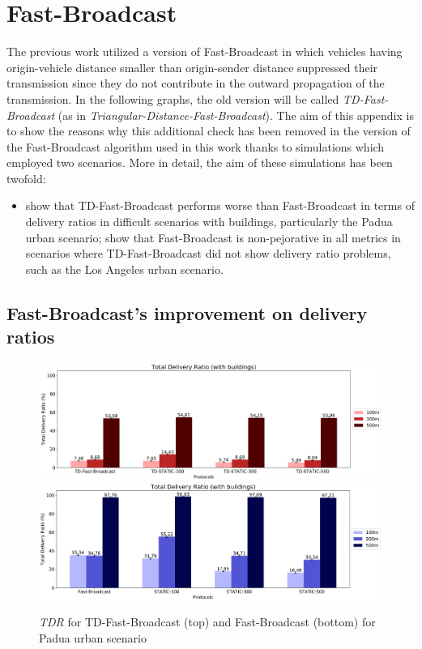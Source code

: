 
\chapter{Fast-Broadcast}
	The previous work \cite{ROM2017} utilized a version of Fast-Broadcast in which vehicles having origin-vehicle distance smaller than origin-sender distance suppressed their transmission since they do not contribute in the outward propagation of the transmission. In the following graphs, the old version will be called \textit{TD-Fast-Broadcast} (as in \textit{Triangular-Distance-Fast-Broadcast}). The aim of this appendix is to show the reasons why this additional check has been removed in the version of the Fast-Broadcast algorithm used in this work thanks to simulations which employed two scenarios. More in detail, the aim of these simulations has been twofold:
	\begin{itemize}
		\item show that TD-Fast-Broadcast performs worse than Fast-Broadcast in terms of delivery ratios in difficult scenarios with buildings, particularly the Padua urban scenario;
		\show show that Fast-Broadcast is non-pejorative in all metrics in scenarios where TD-Fast-Broadcast did not show delivery ratio problems, such as the Los Angeles urban scenario.
	\end{itemize}

	\section{Fast-Broadcast's improvement on delivery ratios}
		\begin{figure}[H]
			\centering
			\includegraphics[width=1.0\textwidth]{immagini/td-fb-pd/td-fb/tdr}
			\includegraphics[width=1.0\textwidth]{immagini/td-fb-pd/fb/tdr}
			\caption{\textit{TDR} for TD-Fast-Broadcast (top) and Fast-Broadcast (bottom) for Padua urban scenario}
			\label{fig:td-tdr}
		\end{figure}
	
